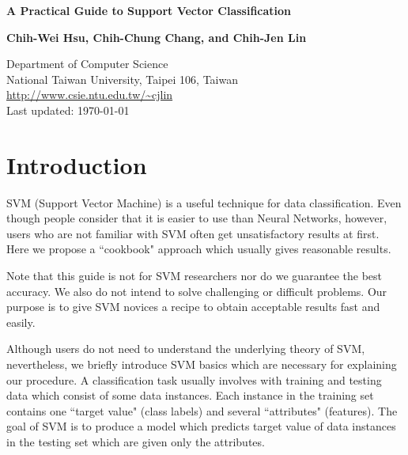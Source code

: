 \documentclass[12pt]{article}
\begin{document}
\setlength{\baselineskip}{18pt}
\begin{center}
{\Large\bf A Practical Guide to Support Vector Classification}

\bigskip

{\bf Chih-Wei Hsu, Chih-Chung Chang, and
 Chih-Jen Lin}\\
\medskip

Department of Computer Science\\
National Taiwan University, Taipei 106, Taiwan \\
\url{http://www.csie.ntu.edu.tw/~cjlin}\\
Last updated: \today
\end{center}
\medskip


\begin{abstract}
Support vector machine (SVM) is a popular technique for 
classification. However, beginners who 
are not familiar with SVM often get 
unsatisfactory results since they miss some easy but 
significant steps. In this guide, we propose a 
simple procedure, which usually gives reasonable results. 
\end{abstract}

\section{Introduction}
\label{intro}
SVM (Support Vector Machine) is a useful technique for data
classification. Even though people consider that it is easier
to use than Neural Networks, however, users who are not 
familiar with SVM often get unsatisfactory results at first.
Here we propose a ``cookbook" approach which usually gives 
reasonable results. 

Note that this guide is not for SVM researchers nor do 
we guarantee the best accuracy. We also do not intend 
to solve challenging or difficult problems. Our purpose 
is to give SVM novices a recipe to obtain acceptable 
results fast and easily.

Although users do not need to understand the underlying 
theory of SVM, nevertheless, we briefly introduce SVM
basics which are necessary for explaining
our procedure. A classification task usually involves 
with training and testing data which 
consist of some data instances. Each instance in the  
training set contains one ``target value" (class labels) 
and several ``attributes" (features). 
The goal of SVM is to produce a model which 
predicts target value of data instances in the testing 
set which are given only the attributes.
\end{document}
